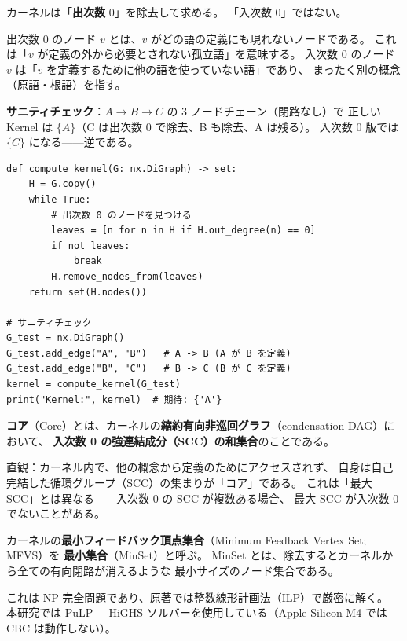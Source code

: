 \documentclass[lang=jp, color=black, mode=simple, 11pt]{elegantbook}
\begin{document}
\begin{caution}
  カーネルは「\textbf{出次数} 0」を除去して求める。
  「入次数 0」ではない。

  \medskip
  出次数 0 のノード $v$ とは、$v$ がどの語の定義にも現れないノードである。
  これは「$v$ が定義の外から必要とされない孤立語」を意味する。
  入次数 0 のノード $v$ は「$v$ を定義するために他の語を使っていない語」であり、
  まったく別の概念（原語・根語）を指す。

  \medskip
  \textbf{サニティチェック}：$A \to B \to C$ の 3 ノードチェーン（閉路なし）で
  正しい Kernel は $\{A\}$（C は出次数 0 で除去、B も除去、A は残る）。
  入次数 0 版では $\{C\}$ になる——逆である。
\end{caution}

\begin{tryit}[カーネル計算を実装する]
\begin{lstlisting}[caption=カーネルの正しい実装]
def compute_kernel(G: nx.DiGraph) -> set:
    H = G.copy()
    while True:
        # 出次数 0 のノードを見つける
        leaves = [n for n in H if H.out_degree(n) == 0]
        if not leaves:
            break
        H.remove_nodes_from(leaves)
    return set(H.nodes())

# サニティチェック
G_test = nx.DiGraph()
G_test.add_edge("A", "B")   # A -> B (A が B を定義)
G_test.add_edge("B", "C")   # B -> C (B が C を定義)
kernel = compute_kernel(G_test)
print("Kernel:", kernel)  # 期待: {'A'}
\end{lstlisting}
\end{tryit}

\begin{definition}[コア]
  \textbf{コア}（Core）とは、カーネルの\textbf{縮約有向非巡回グラフ}（condensation DAG）において、
  \textbf{入次数 0 の強連結成分（SCC）の和集合}のことである。

  直観：カーネル内で、他の概念から定義のためにアクセスされず、
  自身は自己完結した循環グループ（SCC）の集まりが「コア」である。
  これは「最大 SCC」とは異なる——入次数 0 の SCC が複数ある場合、
  最大 SCC が入次数 0 でないことがある。
\end{definition}

\begin{definition}
  カーネルの\textbf{最小フィードバック頂点集合}（Minimum Feedback Vertex Set; MFVS）を
  \textbf{最小集合}（MinSet）と呼ぶ。
  MinSet とは、除去するとカーネルから全ての有向閉路が消えるような
  最小サイズのノード集合である。

  \medskip
  これは NP 完全問題であり、原著では整数線形計画法（ILP）で厳密に解く。
  本研究では PuLP + HiGHS ソルバーを使用している（Apple Silicon M4 では CBC は動作しない）。
\end{definition}
\end{document}
